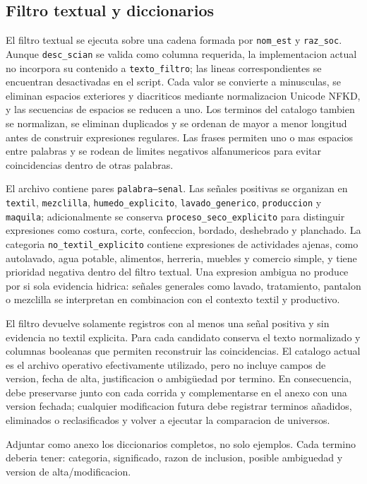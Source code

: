 \documentclass[11pt,letterpaper]{article}
\begin{document}
\subsection{Filtro textual y diccionarios}
El filtro textual se ejecuta sobre una cadena formada por \texttt{nom\_est} y \texttt{raz\_soc}. Aunque \texttt{desc\_scian} se valida como columna requerida, la implementacion actual no incorpora su contenido a \texttt{texto\_filtro}; las lineas correspondientes se encuentran desactivadas en el script. Cada valor se convierte a minusculas, se eliminan espacios exteriores y diacriticos mediante normalizacion Unicode NFKD, y las secuencias de espacios se reducen a uno. Los terminos del catalogo tambien se normalizan, se eliminan duplicados y se ordenan de mayor a menor longitud antes de construir expresiones regulares. Las frases permiten uno o mas espacios entre palabras y se rodean de limites negativos alfanumericos para evitar coincidencias dentro de otras palabras.

El archivo  contiene pares \texttt{palabra--senal}. Las señales positivas se organizan en \texttt{textil}, \texttt{mezclilla}, \texttt{humedo\_explicito}, \texttt{lavado\_generico}, \texttt{produccion} y \texttt{maquila}; adicionalmente se conserva \texttt{proceso\_seco\_explicito} para distinguir expresiones como costura, corte, confeccion, bordado, deshebrado y planchado. La categoria \texttt{no\_textil\_explicito} contiene expresiones de actividades ajenas, como autolavado, agua potable, alimentos, herreria, muebles y comercio simple, y tiene prioridad negativa dentro del filtro textual. Una expresion ambigua no produce por si sola evidencia hidrica: señales generales como lavado, tratamiento, pantalon o mezclilla se interpretan en combinacion con el contexto textil y productivo.

El filtro devuelve solamente registros con al menos una señal positiva y sin evidencia no textil explicita. Para cada candidato conserva el texto normalizado y columnas booleanas que permiten reconstruir las coincidencias. El catalogo actual es el archivo operativo efectivamente utilizado, pero no incluye campos de version, fecha de alta, justificacion o ambigüedad por termino. En consecuencia, debe preservarse junto con cada corrida y complementarse en el anexo con una version fechada; cualquier modificacion futura debe registrar terminos añadidos, eliminados o reclasificados y volver a ejecutar la comparacion de universos.

\begin{evidencia}
Adjuntar como anexo los diccionarios completos, no solo ejemplos. Cada termino deberia tener: categoria, significado, razon de inclusion, posible ambiguedad y version de alta/modificacion.
\end{evidencia}
\end{document}
